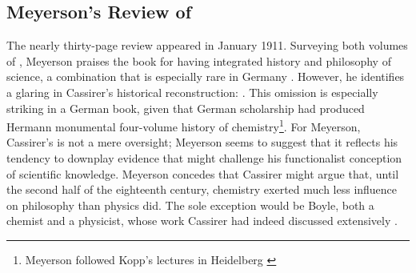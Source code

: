 \documentclass[submitted,12pt]{article}
\begin{document}


\subsection{Meyerson's Review of \EPt}

The nearly thirty-page review appeared in January 1911. Surveying both volumes of \EPt, Meyerson praises the book for having integrated history and philosophy of science, a combination that is especially rare in Germany \citep[101]{Meyerson1911}. However, he identifies a glaring  in Cassirer's historical reconstruction:  \citep[102]{Meyerson1911}. This omission is especially striking in a German book, given that German scholarship had produced Hermann  monumental four-volume history of chemistry\footnote{Meyerson followed Kopp's lectures in Heidelberg \citep[31]{Bensaude-Vincent2016a}}. For Meyerson, Cassirer’s  is not a mere oversight; Meyerson seems to suggest that it reflects his tendency to downplay evidence that might challenge his functionalist conception of scientific knowledge. Meyerson concedes that Cassirer might argue that, until the second half of the eighteenth century, chemistry exerted much less influence on philosophy than physics did. The sole exception would be Boyle, both a chemist and a physicist, whose work Cassirer had indeed discussed extensively \citep[102]{Meyerson1911}.
\end{document}

